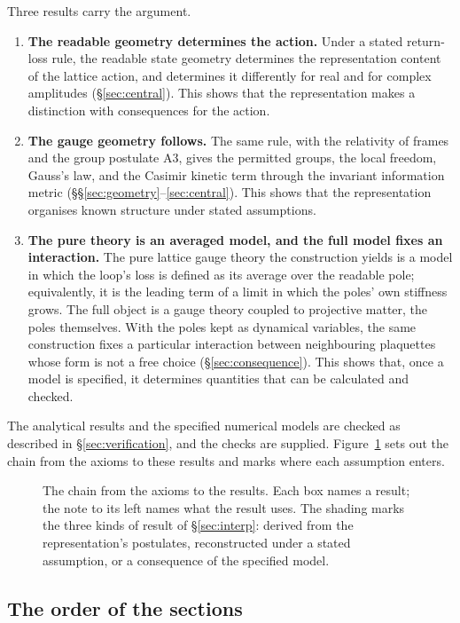 \documentclass[11pt,a4paper]{article}
\theoremstyle{plain}
\theoremstyle{definition}
\theoremstyle{remark}
\begin{document}
Three results carry the argument.
\begin{enumerate}[leftmargin=2em, itemsep=3pt]
\item \textbf{The readable geometry determines the action.} Under a stated return-loss rule, the readable state geometry determines the representation content of the lattice action, and determines it differently for real and for complex amplitudes (\S\ref{sec:central}). This shows that the representation makes a distinction with consequences for the action.
\item \textbf{The gauge geometry follows.} The same rule, with the relativity of frames and the group postulate A3, gives the permitted groups, the local freedom, Gauss's law, and the Casimir kinetic term through the invariant information metric (\S\S\ref{sec:geometry}--\ref{sec:central}). This shows that the representation organises known structure under stated assumptions.
\item \textbf{The pure theory is an averaged model, and the full model fixes an interaction.} The pure lattice gauge theory the construction yields is a model in which the loop's loss is defined as its average over the readable pole; equivalently, it is the leading term of a limit in which the poles' own stiffness grows. The full object is a gauge theory coupled to projective matter, the poles themselves. With the poles kept as dynamical variables, the same construction fixes a particular interaction between neighbouring plaquettes whose form is not a free choice (\S\ref{sec:consequence}). This shows that, once a model is specified, it determines quantities that can be calculated and checked.
\end{enumerate}
The analytical results and the specified numerical models are checked as described in \S\ref{sec:verification}, and the checks are supplied. Figure~\ref{fig:map} sets out the chain from the axioms to these results and marks where each assumption enters.

\begin{figure}[!htbp]
\centering

\caption{The chain from the axioms to the results. Each box names a result; the note to its left names what the result uses. The shading marks the three kinds of result of \S\ref{sec:interp}: derived from the representation's postulates, reconstructed under a stated assumption, or a consequence of the specified model.}
\label{fig:map}
\end{figure}

\subsection{The order of the sections}
\end{document}
